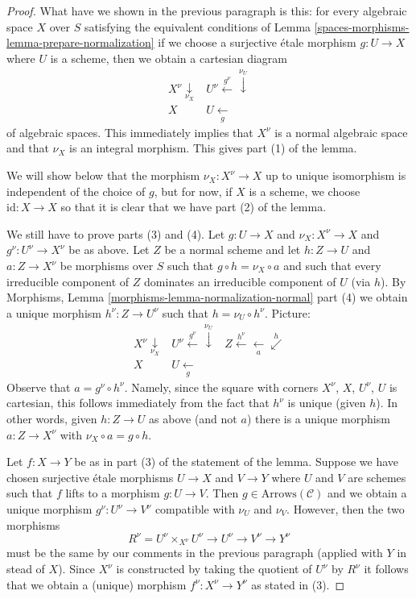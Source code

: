 \begin{proof}
\medskip\noindent
What have we shown in the previous paragraph is this: for every algebraic
space $X$ over $S$ satisfying the equivalent conditions of
Lemma \ref{spaces-morphisms-lemma-prepare-normalization} if we choose a surjective \'etale
morphism $g : U \to X$ where $U$ is a scheme, then we obtain
a cartesian diagram
$$
\begin{array}{cc}X^\nu \underset{\nu_X}{\downarrow} & U^\nu \overset{g^\nu}{\longleftarrow}\overset{\nu_U}{\downarrow} \\ X & U \underset{g}{\longleftarrow}\end{array}
$$
of algebraic spaces. This immediately implies that $X^\nu$ is a normal
algebraic space and that $\nu_X$ is an integral morphism. This gives
part (1) of the lemma.

\medskip\noindent
We will show below that the morphism $\nu_X : X^\nu \to X$
up to unique isomorphism is independent of the choice of $g$,
but for now, if $X$ is a scheme, we choose $\text{id} : X \to X$
so that it is clear that we have part (2) of the lemma.

\medskip\noindent
We still have to prove parts (3) and (4). Let $g : U \to X$ and
$\nu_X : X^\nu \to X$ and $g^\nu : U^\nu \to X^\nu$ be as above.
Let $Z$ be a normal scheme and let $h : Z \to U$ and $a : Z \to X^\nu$
be morphisms over $S$ such that $g \circ h = \nu_X \circ a$ and such that
every irreducible component of $Z$ dominates an irreducible component of $U$
(via $h$). By
Morphisms, Lemma \ref{morphisms-lemma-normalization-normal} part (4)
we obtain a unique morphism $h^\nu : Z \to U^\nu$ such
that $h = \nu_U \circ h^\nu$. Picture:
$$
\begin{array}{ccc}X^\nu \underset{\nu_X}{\downarrow} & U^\nu \overset{g^\nu}{\longleftarrow}\overset{\nu_U}{\downarrow} & Z \overset{h^\nu}{\longleftarrow}\underset{a}{\longleftarrow}\overset{h}{\swarrow} \\ X & U \underset{g}{\longleftarrow} & \end{array}
$$
Observe that $a = g^\nu \circ h^\nu$. Namely, since the square with
corners $X^\nu$, $X$, $U^\nu$, $U$ is cartesian, this follows
immediately from the fact that $h^\nu$ is unique (given $h$).
In other words, given $h : Z \to U$ as above (and not $a$)
there is a unique morphism $a : Z \to X^\nu$ with
$\nu_X \circ a = g \circ h$.

\medskip\noindent
Let $f : X \to Y$ be as in part (3) of the statement of the lemma.
Suppose we have chosen surjective \'etale morphisms $U \to X$ and
$V \to Y$ where $U$ and $V$ are schemes such that $f$ lifts to a
morphism $g : U \to V$. Then $g \in \text{Arrows}(\mathcal{C})$
and we obtain a unique morphism $g^\nu : U^\nu \to V^\nu$ compatible
with $\nu_U$ and $\nu_V$. However, then the two morphisms
$$
R^\nu = U^\nu \times_{X^\nu} U^\nu
\to U^\nu \to V^\nu \to Y^\nu
$$
must be the same by our comments in the previous paragraph (applied
with $Y$ in stead of $X$).
Since $X^\nu$ is constructed by taking the quotient of
$U^\nu$ by $R^\nu$ it follows that we obtain a (unique)
morphism $f^\nu : X^\nu \to Y^\nu$ as stated in (3).


\end{proof}
